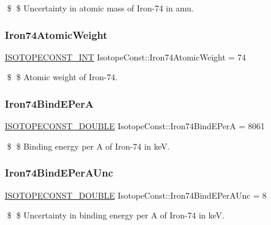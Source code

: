 \$ \$ Uncertainty in atomic mass of Iron-\/74 in amu. \mbox{\label{group___isotope_const-_iron-_fe74_gaf3810e1f05d79879d1061a2e40e8f758}} 
\subsubsection{\texorpdfstring{Iron74\+Atomic\+Weight}{Iron74AtomicWeight}}
{\footnotesize\ttfamily \mbox{\hyperlink{group___isotope_const-_macros_ga5f18360b3e99483a35c32d789e62621c}{I\+S\+O\+T\+O\+P\+E\+C\+O\+N\+S\+T\+\_\+\+I\+NT}} Isotope\+Const\+::\+Iron74\+Atomic\+Weight = 74}

\$ \$ Atomic weight of Iron-\/74. \mbox{\label{group___isotope_const-_iron-_fe74_gab60b5e06a63adf86e1a855dcd094d8c3}} 
\subsubsection{\texorpdfstring{Iron74\+Bind\+E\+PerA}{Iron74BindEPerA}}
{\footnotesize\ttfamily \mbox{\hyperlink{group___isotope_const-_macros_ga8f45a7272ce02c0b4c65c44636ed719a}{I\+S\+O\+T\+O\+P\+E\+C\+O\+N\+S\+T\+\_\+\+D\+O\+U\+B\+LE}} Isotope\+Const\+::\+Iron74\+Bind\+E\+PerA = 8061}

\$ \$ Binding energy per A of Iron-\/74 in keV. \mbox{\label{group___isotope_const-_iron-_fe74_gad7b65c73cca5d3515a8d6f003616461f}} 
\subsubsection{\texorpdfstring{Iron74\+Bind\+E\+Per\+A\+Unc}{Iron74BindEPerAUnc}}
{\footnotesize\ttfamily \mbox{\hyperlink{group___isotope_const-_macros_ga8f45a7272ce02c0b4c65c44636ed719a}{I\+S\+O\+T\+O\+P\+E\+C\+O\+N\+S\+T\+\_\+\+D\+O\+U\+B\+LE}} Isotope\+Const\+::\+Iron74\+Bind\+E\+Per\+A\+Unc = 8}

\$ \$ Uncertainty in binding energy per A of Iron-\/74 in keV. \mbox{\label{group___isotope_const-_iron-_fe74_gabcfeb54d7b63a5bb815c29786387436b}} 
